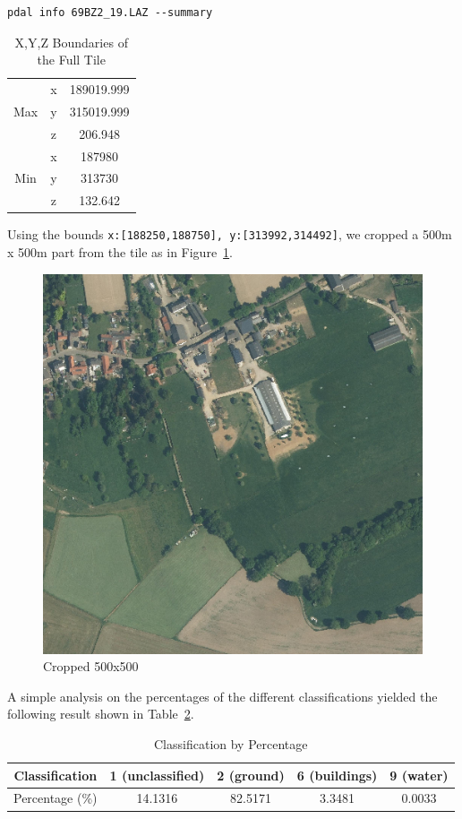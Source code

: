 \documentclass{article}
\begin{document}
\begin{verbatim}
pdal info 69BZ2_19.LAZ --summary
\end{verbatim}


\begin{table}[hbt!]
    \centering
    \renewcommand{\arraystretch}{1.5}
    \caption{X,Y,Z Boundaries of the Full Tile}
    \small
    \vspace{0.5\abovecaptionskip}
    \label{table1}
    \begin{tabular}{c|c|c}
        \hline
        \multirow{3}{*}{Max} & x & 189019.999\\   
                             & y & 315019.999\\  
                             & z & 206.948\\
         \hline
         \multirow{3}{*}{Min} & x & 187980\\  
                              & y & 313730\\  
                              & z & 132.642\\
        \hline
    \end{tabular}
\end{table}

\noindent Using the bounds \texttt{x:[188250,188750], y:[313992,314492]}, we cropped a 500m x 500m part from the tile as in Figure~\ref{figure2}.\\

\begin{figure}[hbt!]
    \centering
    \includegraphics[width=0.4\linewidth]{Figures/cropped tile.png}
    \caption{Cropped 500x500}
    \label{figure2}
\end{figure}

\noindent A simple analysis on the percentages of the different classifications yielded the following result shown in Table~\ref{table2}.

\begin{table}[hbt!]
    \centering
    \renewcommand{\arraystretch}{1.5}
    \small
    \caption{Classification by Percentage}
    \vspace{0.5\abovecaptionskip}
    \begin{tabular}{c|cccc}
        \hline
         Classification  & 1 (unclassified) & 2 (ground)  & 6 (buildings)  & 9 (water)   \\
         \hline
         Percentage (\%) & 14.1316 & 82.5171  & 3.3481  & 0.0033 \\
         \hline
    \end{tabular}
    \label{table2}
\end{table}
\end{document}
